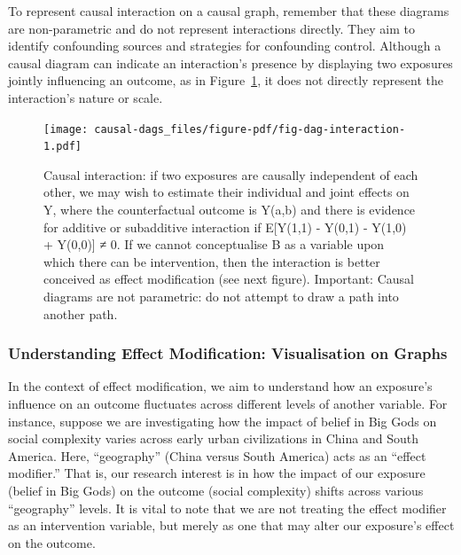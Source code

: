 \documentclass[
  singlecolumn]{report}
\begin{document}
To represent causal interaction on a causal graph, remember that these
diagrams are non-parametric and do not represent interactions directly.
They aim to identify confounding sources and strategies for confounding
control. Although a causal diagram can indicate an interaction's
presence by displaying two exposures jointly influencing an outcome, as
in Figure~\ref{fig-dag-interaction}, it does not directly represent the
interaction's nature or scale.

\begin{figure}

{\centering \texttt{[image: causal-dags\_files/figure-pdf/fig-dag-interaction-1.pdf]}

}

\caption{\label{fig-dag-interaction}Causal interaction: if two exposures
are causally independent of each other, we may wish to estimate their
individual and joint effects on Y, where the counterfactual outcome is
Y(a,b) and there is evidence for additive or subadditive interaction if
E{[}Y(1,1) - Y(0,1) - Y(1,0) + Y(0,0){]} ≠ 0. If we cannot conceptualise
B as a variable upon which there can be intervention, then the
interaction is better conceived as effect modification (see next
figure). Important: Causal diagrams are not parametric: do not attempt
to draw a path into another path.}

\end{figure}

\hypertarget{understanding-effect-modification-visualisation-on-graphs}{%
\subsubsection{\texorpdfstring{\textbf{Understanding Effect
Modification: Visualisation on
Graphs}}{Understanding Effect Modification: Visualisation on Graphs}}\label{understanding-effect-modification-visualisation-on-graphs}}

In the context of effect modification, we aim to understand how an
exposure's influence on an outcome fluctuates across different levels of
another variable. For instance, suppose we are investigating how the
impact of belief in Big Gods on social complexity varies across early
urban civilizations in China and South America. Here, ``geography''
(China versus South America) acts as an ``effect modifier.'' That is,
our research interest is in how the impact of our exposure (belief in
Big Gods) on the outcome (social complexity) shifts across various
``geography'' levels. It is vital to note that we are not treating the
effect modifier as an intervention variable, but merely as one that may
alter our exposure's effect on the outcome.
\end{document}

